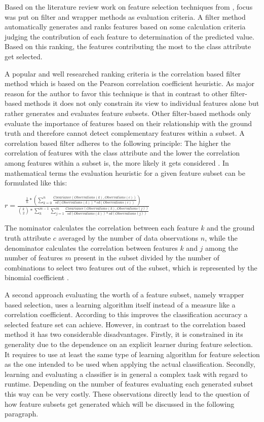 Based on the literature review work on feature selection techniques from \cite{chandrashekar2014survey}, focus was put on filter and wrapper methods as evaluation criteria. A filter method automatically generates and ranks features based on some calculation criteria judging the contribution of each feature to determination of the predicted value. Based on this ranking, the features contributing the most to the class attribute get selected.

A popular and well researched ranking criteria is the correlation based filter method which is based on the Pearson correlation coefficient heuristic. As major reason for the author to favor this technique is that in contrast to other filter-based methods it does not only constrain its view to individual features alone but rather generates and evaluates feature subsets. Other filter-based methods only evaluate the importance of features based on their relationship with the ground truth and therefore cannot detect complementary features within a subset. A correlation based filter adheres to the following principle: The higher the correlation of features with the class attribute and the lower the correlation among features within a subset is, the more likely it gets considered \cite{hall2000correlation}. In mathematical terms the evaluation heuristic for a given feature subset can be formulated like this:

$r = \frac{\frac{1}{n} * (\displaystyle\sum_{k=0}^{n} \frac{Covariance(Observations(k), Observations(c))}{sd(Observations(k)) * sd(Observations(c))})}{\binom{k}{2} * \displaystyle\sum_{k}^{m - 1} \displaystyle\sum_{j = 1}^{m} \frac{Covariance(Observations(k), Observations(j))}{sd(Observations(k)) * sd(Observations(j))}}$

The nominator calculates the correlation between each feature $k$ and the ground truth attribute $c$ averaged by the number of data observations $n$, while the denominator calculates the correlation between features $k$ and $j$ among the number of features $m$ present in the subset divided by the number of combinations to select two features out of the subset, which is represented by the binomial coefficient \cite{hall2000correlation}. 

A second approach evaluating the worth of a feature subset, namely wrapper based selection, uses a learning algorithm itself instead of a measure like a correlation coefficient. According to \cite{dash1997feature} this improves the classification accuracy a selected feature set can achieve. However, in contrast to the correlation based method it has two considerable disadvantages. Firstly, it is constrained in its generality due to the dependence on an explicit learner during feature selection. It requires to use at least the same type of learning algorithm for feature selection as the one intended to be used when applying the actual classification. Secondly, learning and evaluating a classifier is in general a complex task with regard to runtime. Depending on the number of features evaluating each generated subset this way can be very costly. These observations directly lead to the question of how feature subsets get generated which will be discussed in the following paragraph. 

